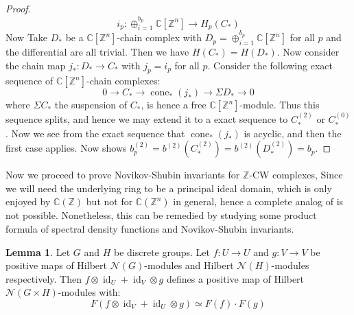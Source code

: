 \documentclass[11pt]{report}
\theoremstyle{definition}
\newtheorem{Lemma}[Def]{Lemma}
\theoremstyle{plain}
\DeclareMathOperator{\id}{id}
\DeclareMathOperator{\cone}{cone}
\newcommand{\complex}{\mathbb{C}}
\newcommand{\integer}{\mathbb{Z}}
\newcommand{\vna}{\mathcal{N}}
\begin{document}
\begin{proof}
\begin{equation}
i_p:\oplus^{b_p}_{i=1}\complex[\integer^n]\to H_p(C_*)
\end{equation}
Now Take $D_*$ be a $\complex[\integer^n]$-chain complex with $D_p=\oplus_{i=1}^{b_p}\complex[\integer^n]$ for all $p$ and the differential are all trivial. Then we have $H(C_*)=H(D_*)$. Now consider the chain map $j_*: D_*\to C_*$ with $j_p=i_p$ for all $p$. Consider the following exact sequence of $\complex[\integer^n]$-chain complexes:
\begin{equation*}
0\longrightarrow C_*\longrightarrow \cone_*(j_*)\longrightarrow \Sigma D_*\longrightarrow 0
\end{equation*}
where $\Sigma C_*$ the suspension of $C_*$, is hence a free $\complex[\integer^n]$-module. Thus this sequence splits, and hence we may extend it to a exact sequence to $C^{(2)}_*$ or $C^{(0)}_*$. Now we see from the exact sequence that $\cone_*(j_*)$ is acyclic, and then the first case applies. Now  shows $b_p^{(2)}=b^{(2)}(C_*^{(2)})=b^{(2)}(D_*^{(2)})=b_p$.
\end{proof}
Now we proceed to prove Novikov-Shubin invariants for $\integer$-CW complexes, Since we will need the underlying ring to be a principal ideal domain, which is only enjoyed by $\complex(\integer)$ but not for $\complex(\integer^n)$ in general, hence a complete analog of  is not possible. Nonetheless, this can be remedied by studying some product formula of spectral density functions and Novikov-Shubin invariants.
\begin{Lemma}\label{2.31}
	Let $G$ and $H$ be discrete groups. Let $f:U\to U$ and $g:V\to V$ be positive maps of Hilbert $\vna(G)$-modules and Hilbert $\vna(H)$-modules respectively. Then $f\otimes \id_U+\id_V\otimes g$ defines a positive map of Hilbert $\vna(G\times H)$-modules with:
	\begin{equation}
	F(f\otimes \id_V+\id_U\otimes g)\simeq F(f)\cdot F(g)
	\end{equation}
\end{Lemma}
\end{document}
